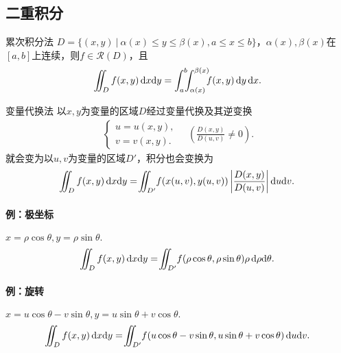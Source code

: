 \subsection{二重积分}
\begin{theorem}{累次积分法}{}
	$D=\{(x,y)~|~\alpha(x)\leqslant y\leqslant\beta(x),a\leqslant x\leqslant b\}$，$\alpha(x),\beta(x)$在$[a,b]$上连续，则$f\in\mathscr R(D)$，且
	\[
		\intt_Df(x,y)\d x\nd y=\int_a^b\bs5\int_{\alpha(x)}^{\beta(x)}\bs5f(x,y)\d y\d x.
	\]
\end{theorem}
\begin{theorem}{变量代换法}{}
	以$x,y$为变量的区域$D$经过变量代换及其逆变换
	\begin{align*}
		\begin{cases}
			u=u(x,y), \\
			v=v(x,y).
		\end{cases}
		\quad\left(\frac{D(x,y)}{D(u,v)}\neq 0\right).
	\end{align*}
	就会变为以$u,v$为变量的区域$D'$，积分也会变换为
	\[
		\intt_Df(x,y)\d x\nd y=\intt_{D'}\bs2f(x(u,v),y(u,v))\left|\frac{D(x,y)}{D(u,v)}\right|\d u\nd v.
	\]
\end{theorem}
\paragraph{例：极坐标}$x=\rho\cos\theta,y=\rho\sin\theta.$
\[
	\intt_Df(x,y)\d x\nd y=\intt_{D'}\bs2f(\rho\cos\theta,\rho\sin\theta)\rho\d\rho\nd\theta.
\]
\paragraph{例：旋转}$x=u\cos\theta-v\sin\theta,y=u\sin\theta+v\cos\theta.$
\[
	\intt_Df(x,y)\d x\nd y=\intt_{D'}\bs2f(u\cos\theta-v\sin\theta,u\sin\theta+v\cos\theta)\d u\nd v.
\]
